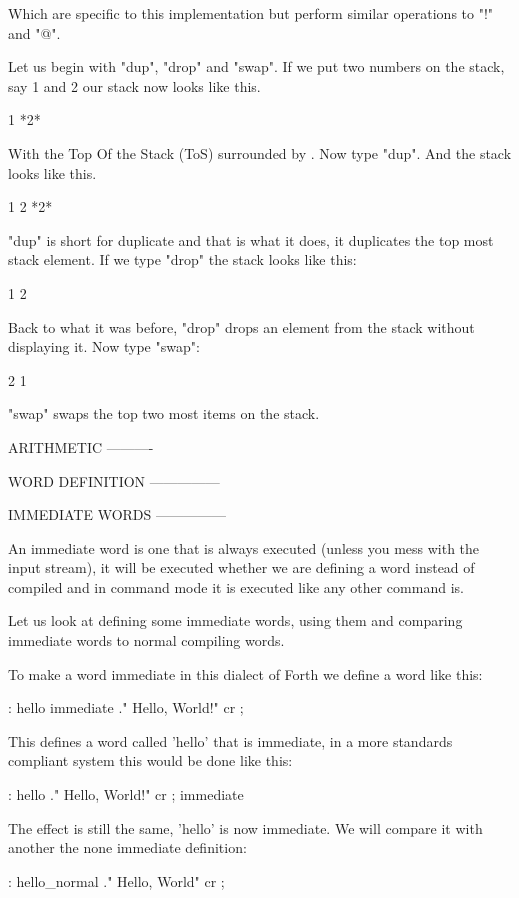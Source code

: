 \begin{DoxyVerb}Which are specific to this implementation but perform similar operations to 
"!" and "@".

Let us begin with "dup", "drop" and "swap". If we put two numbers on the stack,
say 1 and 2 our stack now looks like this.

    1 *2*

With the Top Of the Stack (ToS) surrounded by \*. Now type "dup". And the stack
looks like this.

    1 2 *2*

"dup" is short for duplicate and that is what it does, it duplicates the top
most stack element. If we type "drop" the stack looks like this:

    1 2

Back to what it was before, "drop" drops an element from the stack without
displaying it. Now type "swap":

    2 1

"swap" swaps the top two most items on the stack.

ARITHMETIC
----------

WORD DEFINITION
---------------

IMMEDIATE WORDS
---------------

An immediate word is one that is always executed (unless you mess with the input
stream), it will be executed whether we are defining a word instead of compiled
and in command mode it is executed like any other command is.

Let us look at defining some immediate words, using them and comparing immediate
words to normal compiling words.

To make a word immediate in this dialect of Forth we define a word like this:\end{DoxyVerb}
 \begin{DoxyVerb}: hello immediate ." Hello, World!" cr ;
\end{DoxyVerb}


\begin{DoxyVerb}This defines a word called 'hello' that is immediate, in a more standards
compliant system this would be done like this:\end{DoxyVerb}
 \begin{DoxyVerb}: hello ." Hello, World!" cr ; immediate
\end{DoxyVerb}


\begin{DoxyVerb}The effect is still the same, 'hello' is now immediate. We will compare it with
another the none immediate definition:\end{DoxyVerb}
 \begin{DoxyVerb}: hello_normal ." Hello, World" cr ;
\end{DoxyVerb}


